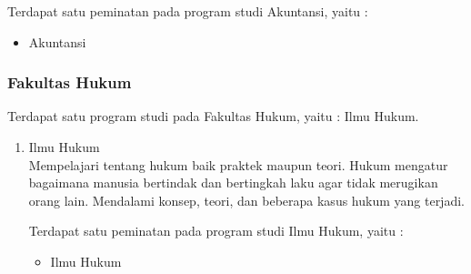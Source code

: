 \begin{enumerate}
			Terdapat satu peminatan pada program studi Akuntansi, yaitu :
			\begin{itemize}
				\item Akuntansi
			\end{itemize}\leavevmode
		
			
	\end{enumerate}\leavevmode

\subsubsection{Fakultas Hukum}
Terdapat satu program studi pada Fakultas Hukum, yaitu : Ilmu Hukum.

	\begin{enumerate}
		\item Ilmu Hukum\\
			Mempelajari tentang hukum baik praktek maupun teori. Hukum mengatur bagaimana manusia bertindak dan bertingkah laku agar tidak merugikan orang lain. Mendalami konsep, teori, dan beberapa kasus hukum yang terjadi.
			
			Terdapat satu peminatan pada program studi Ilmu Hukum, yaitu :
			
			\begin{itemize}
				\item Ilmu Hukum
			\end{itemize}\leavevmode
			
	\end{enumerate}\leavevmode

